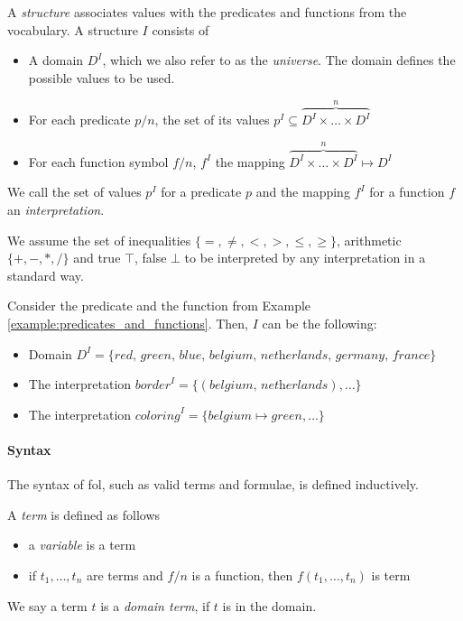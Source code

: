 A \textit{structure} associates values with the predicates and functions from the vocabulary. A structure $I$ consists of

\begin{itemize}
  \item A domain $D^I$, which we also refer to as the \textit{universe}. The domain defines the possible values to be used.
  \item For each predicate $p/n$, the set of its values $p^I \subseteq \overbrace{D^I \times \dots \times D^I}^{n}$
  \item For each function symbol $f/n$,  $f^I$ the mapping  $\overbrace{D^I \times \dots \times D^I}^{n} \mapsto D^I$
\end{itemize}
We call the set of values $p^I$ for a predicate $p$  and the mapping $f^I$ for a function $f$ an \textit{interpretation}.

We assume the set of inequalities $\{ =, \neq, <, >, \leq, \geq \}$,  arithmetic $\{+, -, *, / \}$ and true $\top$, false $\bot$ to be interpreted by any interpretation in a standard way.

\begin{example}
  Consider the predicate and the function from Example \ref{example:predicates_and_functions}. Then, $I$ can be the following:
  \begin{itemize}
    \item Domain $D^I = \{ \textit{red, green, blue, belgium, netherlands, germany, france} \}$
    \item The interpretation $\textit{border}^I = \{ (\textit{belgium, netherlands}), \dots \}$                                                                                     
    \item The interpretation $\textit{coloring}^I = \{ \textit{belgium} \mapsto \textit{green}, \dots \}$                                                                                     
  \end{itemize}
\end{example}


\paragraph{Syntax} 

The syntax of \acrlong{fol}, such as valid terms and formulae, is defined inductively.

A \textit{term} is defined as follows  
\begin{itemize}
  \item a \textit{variable} is a term
  \item if $t_1,\dots,t_n$ are terms and $f/n$ is a function, then $f(t_1,\dots,t_n)$ is term
\end{itemize}
We say a term $t$ is a \textit{domain term}, if $t$ is in the domain.


